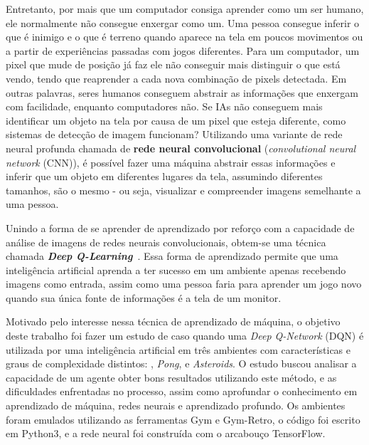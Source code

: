Entretanto, por mais que um computador consiga aprender como um ser humano, ele normalmente não consegue enxergar como um.
Uma pessoa consegue inferir o que é inimigo e o que é terreno quando aparece na tela em poucos movimentos ou a partir de experiências passadas com jogos diferentes.
Para um computador, um pixel que mude de posição já faz ele não conseguir mais distinguir o que está vendo, tendo que reaprender a cada nova combinação de pixels detectada.
Em outras palavras, seres humanos conseguem abstrair as informações que enxergam com facilidade, enquanto computadores não.
Se IAs não conseguem mais identificar um objeto na tela por causa de um pixel que esteja diferente, como sistemas de detecção de imagem funcionam?
Utilizando uma variante de rede neural profunda chamada de \textbf{rede neural convolucional} (\textit{convolutional neural network} (CNN)), é possível fazer uma máquina abstrair essas informações e inferir que um objeto em diferentes lugares da tela, assumindo diferentes tamanhos, são o mesmo - ou seja, visualizar e compreender imagens semelhante a uma pessoa.

Unindo a forma de se aprender de aprendizado por reforço com a capacidade de análise de imagens de redes neurais convolucionais, obtem-se uma técnica chamada \textit{\textbf{Deep Q-Learning}}~\cite{DBLP:journals/corr/MnihKSGAWR13}.
Essa forma de aprendizado permite que uma inteligência artificial aprenda a ter sucesso em um ambiente apenas recebendo imagens como entrada, assim como uma pessoa faria para aprender um jogo novo quando sua única fonte de informações é a tela de um monitor.

Motivado pelo interesse nessa técnica de aprendizado de máquina, o objetivo deste trabalho foi fazer um estudo de caso quando uma \textit{Deep Q-Network} (DQN) é utilizada por uma inteligência artificial em três ambientes com características e graus de complexidade distintos: , \textit{Pong}, e \textit{Asteroids}.
O estudo buscou analisar a capacidade de um agente obter bons resultados utilizando este método, e as dificuldades enfrentadas no processo, assim como aprofundar o conhecimento em aprendizado de máquina, redes neurais e aprendizado profundo.
Os ambientes foram emulados utilizando as ferramentas Gym e Gym-Retro, o código foi escrito em Python3, e a rede neural foi construída com o arcabouço TensorFlow.

